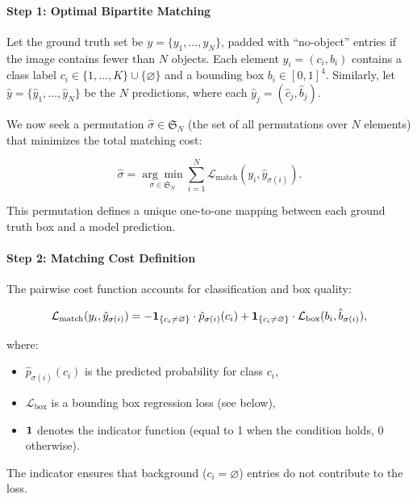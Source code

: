 \begin{enrichment}
\begin{enrichment}
		 \paragraph{Step 1: Optimal Bipartite Matching}
		 Let the ground truth set be \( y = \{y_1, \dots, y_N\} \), padded with “no-object” entries if the image contains fewer than \( N \) objects. Each element \( y_i = (c_i, b_i) \) contains a class label \( c_i \in \{1, \dots, K\} \cup \{\varnothing\} \) and a bounding box \( b_i \in [0,1]^4 \). Similarly, let \( \hat{y} = \{\hat{y}_1, \dots, \hat{y}_N\} \) be the \( N \) predictions, where each \( \hat{y}_j = (\hat{c}_j, \hat{b}_j) \).
		 
		 We now seek a permutation \( \hat{\sigma} \in \mathfrak{S}_N \) (the set of all permutations over \( N \) elements) that minimizes the total matching cost:
		 
		 \[
		 \hat{\sigma} = \underset{\sigma \in \mathfrak{S}_N}{\arg\min} \sum_{i=1}^N \mathcal{L}_\text{match}(y_i, \hat{y}_{\sigma(i)}).
		 \]
		 
		 This permutation defines a unique one-to-one mapping between each ground truth box and a model prediction.
		 
		 \paragraph{Step 2: Matching Cost Definition}
		 
		 The pairwise cost function accounts for classification and box quality:
		 
		 \[
		 \mathcal{L}_\text{match}(y_i, \hat{y}_{\sigma(i)}) = 
		 -\mathbf{1}_{\{c_i \neq \varnothing\}} \cdot \hat{p}_{\sigma(i)}(c_i) 
		 + \mathbf{1}_{\{c_i \neq \varnothing\}} \cdot \mathcal{L}_\text{box}(b_i, \hat{b}_{\sigma(i)}),
		 \]
		 
		 where:
		 \begin{itemize}
		 	\item \( \hat{p}_{\sigma(i)}(c_i) \) is the predicted probability for class \( c_i \),
		 	\item \( \mathcal{L}_\text{box} \) is a bounding box regression loss (see below),
		 	\item \( \mathbf{1} \) denotes the indicator function (equal to 1 when the condition holds, 0 otherwise).
		 \end{itemize}
		 
		 The indicator ensures that background (\( c_i = \varnothing \)) entries do not contribute to the loss.
		 

\end{enrichment}
\end{enrichment}
